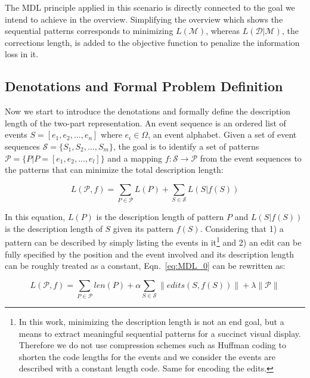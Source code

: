 The MDL principle applied in this scenario is directly connected to the goal we intend to achieve in the overview. Simplifying the overview which shows the sequential patterns corresponds to minimizing $L(\mathscr{M})$, whereas $L(\mathscr{D}|\mathscr{M})$, the corrections length, is added to the objective function to penalize the information loss in it. 

\subsection{Denotations and Formal Problem Definition}

Now we start to introduce the denotations and formally define the description length of the two-part representation. An event sequence is an ordered list of events $S=[e_1, e_2, ..., e_n]$ where $e_i \in \Omega$, an event alphabet. Given a set of event sequences $\mathscr{S} = \{S_1, S_2, ..., S_m\}$, the goal is to identify a set of patterns $\mathscr{P} = \{P|P=[e_1, e_2, ... , e_l]\}$ and a mapping $f:\mathscr{S}\rightarrow \mathscr{P}$ from the event sequences to the patterns that can minimize the total description length: 

\begin{equation}
	L(\mathscr{P},f) = \sum_{P \in \mathscr{P}}L(P) + \sum_{S \in \mathscr{S}}L(S|f(S))
\label{eq:MDL_0}
\end{equation}

In this equation, $L(P)$ is the description length of pattern $P$ and $L(S|f(S))$ is the description length of $S$ given its pattern $f(S)$. Considering that 1) a pattern can be described by simply listing the events in it\footnote{In this work, minimizing the description length is not an end goal, but a means to extract meaningful sequential patterns for a succinct visual display. Therefore we do not use compression schemes such as Huffman coding \cite{salomon2010handbook} to shorten the code lengths for the events and we consider the events are described with a constant length code. Same for encoding the edits.} and 2) an edit can be fully specified by the position and the event involved and its description length can be roughly treated as a constant, Eqn.~\ref{eq:MDL_0} can be rewritten as: 

\begin{equation}
	L(\mathscr{P},f) = \sum_{P \in \mathscr{P}}len(P) + \alpha \sum_{S \in \mathscr{S}}\|edits(S,f(S))\| + \lambda\|\mathscr{P}\|
\label{eq:MDL_1}	
\end{equation}

